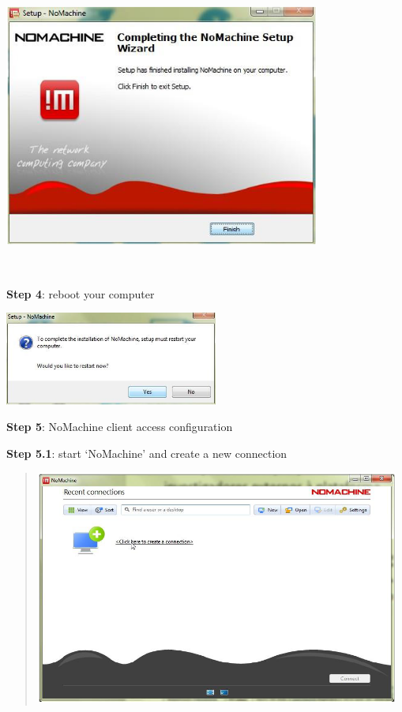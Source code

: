 \documentclass[]{book}
\begin{document}
\includegraphics[width=4.09115in,height=3.14961in]{./media/image24.png}

\textbf{\\
}

\textbf{Step 4}: reboot your computer

\includegraphics[width=2.75591in,height=1.21602in]{./media/image25.png}

\textbf{Step 5}: NoMachine client access configuration

\textbf{Step 5.1}: start `NoMachine' and create a new connection

\begin{quote}
\includegraphics[width=4.72441in,height=3.02971in]{./media/image26.png}
\end{quote}
\end{document}
